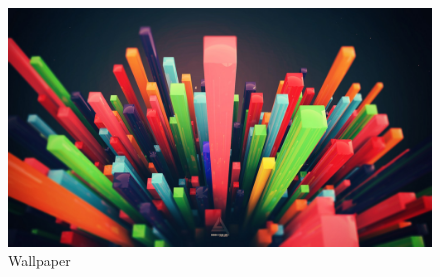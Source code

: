 \documentclass[10pt]{article}
\begin{document}
\begin{figure}[p!]
\includegraphics[width=\linewidth]{walls.jpg}
\caption{Wallpaper}
\label{fig:walls}
\end{figure}
\end{document}
